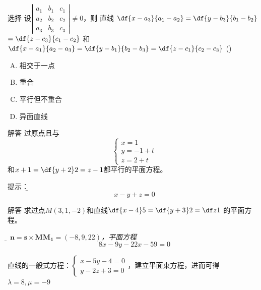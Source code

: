\begin{frame}{选择}
	\linespread{1.3}
	\;设$\left|\begin{array}{ccc}
	a_1 & b_1 & c_1\\ a_2 & b_2 & c_2\\ a_3 & b_3 & c_3
	\end{array}\right|\ne 0$，则
	直线
	$\df{x-a_3}{a_1-a_2}=\df{y-b_3}{b_1-b_2}$
	$=\df{z-c_3}{c_1-c_2}$
	和
	$\df{x-a_1}{a_2-a_3}=\df{y-b_1}{b_2-b_3}=\df{z-c_1}{c_2-c_3}$
	(\underline{\;})
	\begin{enumerate}[(A)]
	  \item 相交于一点
	  \item 重合
	  \item 平行但不重合
	  \item 异面直线
	\end{enumerate}
\end{frame}

\begin{frame}{解答}
	\linespread{1.2}
	\;过原点且与
	$$\left\{\begin{array}{l}
	x=1\\ y=-1+t\\ z=2+t
	\end{array}\right.$$
	和$x+1=\df{y+2}2=z-1$都平行的平面方程。
	
	\pause\alert{提示：}\it\b  
	$$x-y+z=0$$
\end{frame}

\begin{frame}{解答}
	\linespread{1.2}
	\;求过点$M(3,1,-2)$和直线$\df{x-4}5=\df{y+3}2=\df z1$
	的平面方程。
	
	\pause{}\it\b  
	$\bm{n}=\bm{s}\times\bm{MM_1}=(-8,9,22)$，平面方程
	$$8x-9y-22x-59=0$$
	
	\pause{}
	直线的一般式方程：$\left\{\begin{array}{l}x-5y-4=0\\ 
	y-2z+3=0\end{array}\right.$，建立平面束方程，进而可得$\lambda=8,\mu=-9$
\end{frame}

% 	
% 	

